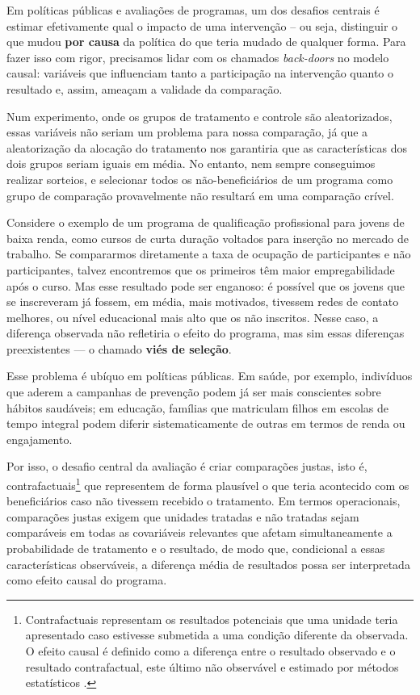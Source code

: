 Em políticas públicas e avaliações de programas, um dos desafios centrais é estimar efetivamente qual o impacto de uma intervenção -- ou seja, distinguir o que mudou \textbf{por causa} da política do que teria mudado de qualquer forma. Para fazer isso com rigor, precisamos lidar com os chamados \textit{back-doors} no modelo causal: variáveis que influenciam tanto a participação na intervenção quanto o resultado e, assim, ameaçam a validade da comparação. 

Num experimento, onde os grupos de tratamento e controle são aleatorizados, essas variáveis não seriam um problema para nossa comparação, já que a aleatorização da alocação do tratamento nos garantiria que as características dos dois grupos seriam iguais em média. No entanto, nem sempre conseguimos realizar sorteios, e selecionar todos os não-beneficiários de um programa como grupo de comparação provavelmente não resultará em uma comparação crível. 

Considere o exemplo de um programa de qualificação profissional para jovens de baixa renda, como cursos de curta duração voltados para inserção no mercado de trabalho. Se compararmos diretamente a taxa de ocupação de participantes e não participantes, talvez encontremos que os primeiros têm maior empregabilidade após o curso.  Mas esse resultado pode ser enganoso: é possível que os jovens que se inscreveram já fossem, em média, mais motivados, tivessem redes de contato melhores, ou nível educacional mais alto que os não inscritos. Nesse caso, a diferença observada não refletiria o efeito do programa, mas sim essas diferenças preexistentes — o chamado \textbf{viés de seleção}.  

Esse problema é ubíquo em políticas públicas. Em saúde, por exemplo, indivíduos que aderem a campanhas de prevenção podem já ser mais conscientes sobre hábitos saudáveis; em educação, famílias que matriculam filhos em escolas de tempo integral podem diferir sistematicamente de outras em termos de renda ou engajamento. 

Por isso, o desafio central da avaliação é criar comparações justas, isto é, contrafactuais\footnote{Contrafactuais representam os resultados potenciais que uma unidade teria apresentado caso estivesse submetida a uma condição diferente da observada. O efeito causal é definido como a diferença entre o resultado observado e o resultado contrafactual, este último não observável e estimado por métodos estatísticos \citep{imbensrubin2015}.} que representem de forma plausível o que teria acontecido com os beneficiários caso não tivessem recebido o tratamento. Em termos operacionais, comparações justas exigem que unidades tratadas e não tratadas sejam comparáveis em todas as covariáveis relevantes que afetam simultaneamente a probabilidade de tratamento e o resultado, de modo que, condicional a essas características observáveis, a diferença média de resultados possa ser interpretada como efeito causal do programa.

